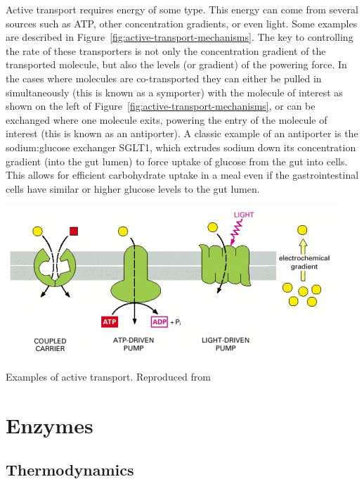 \documentclass{tufte-handout}
\begin{document}
Active transport requires energy of some type.  This energy can come from several sources such as ATP, other concentration gradients, or even light.  Some examples are described in Figure~\ref{fig:active-transport-mechanisms}.  The key to controlling the rate of these transporters is not only the concentration gradient of the transported molecule, but also the levels (or gradient) of the powering force.  In the cases where molecules are co-transported they can either be pulled in simultaneously (this is known as a symporter) with the molecule of interest as shown on the left of Figure~\ref{fig:active-transport-mechanisms}, or can be exchanged where one molecule exits, powering the entry of the molecule of interest (this is known as an antiporter).  A classic example of an antiporter is the sodium:glucose exchanger SGLT1, which extrudes sodium down its concentration gradient (into the gut lumen) to force uptake of glucose from the gut into cells.  This allows for efficient carbohydrate uptake in a meal even if the gastrointestinal cells have similar or higher glucose levels to the gut lumen.

\begin{marginfigure}
\includegraphics{figures/active-transport-mechanisms.jpg}
\caption{Examples of active transport.  Reproduced from \citet{Alberts2002a}}\label{fig:active-transport-mechanisms}
\end{marginfigure}

\section{Enzymes}

\subsection{Thermodynamics}
\end{document}
